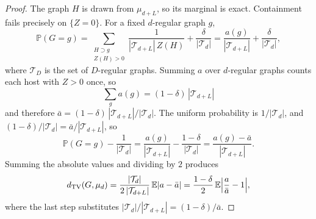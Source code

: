\documentclass[11pt]{article}
\newcommand{\EE}{\mathbb{E}}
\newcommand{\PP}{\mathbb{P}}
\newcommand{\dTV}{d_{\mathrm{TV}}}
\begin{document}
\begin{proof}
The graph \(H\) is drawn from \(\mu_{d+L}\), so its marginal is exact.
Containment fails precisely on \(\{Z=0\}\).
For a fixed \(d\)-regular graph \(g\),
\[
\PP(G=g)
=
\sum_{\substack{H\supset g\\ Z(H)>0}}\frac{1}{|\mathcal T_{d+L}|\,Z(H)}
+
\frac{\delta}{|\mathcal T_d|}
=
\frac{a(g)}{|\mathcal T_{d+L}|}
+
\frac{\delta}{|\mathcal T_d|},
\]
where \(\mathcal T_D\) is the set of \(D\)-regular graphs.
Summing \(a\) over \(d\)-regular graphs counts each host with \(Z>0\) once, so
\[
\sum_g a(g)
=
(1-\delta)\,|\mathcal T_{d+L}|
\]
and therefore \(\bar a=(1-\delta)\,|\mathcal T_{d+L}|/|\mathcal T_d|\).
The uniform probability is \(1/|\mathcal T_d|\), and
\((1-\delta)/|\mathcal T_d|=\bar a/|\mathcal T_{d+L}|\), so
\[
\PP(G=g)-\frac1{|\mathcal T_d|}
=
\frac{a(g)}{|\mathcal T_{d+L}|}
-
\frac{1-\delta}{|\mathcal T_d|}
=
\frac{a(g)-\bar a}{|\mathcal T_{d+L}|}.
\]
Summing the absolute values and dividing by \(2\) produces
\[
\dTV(G,\mu_d)
=
\frac{|\mathcal T_d|}{2\,|\mathcal T_{d+L}|}\,\EE|a-\bar a|
=
\frac{1-\delta}{2}\,
\EE\Bigl|\frac{a}{\bar a}-1\Bigr|,
\]
where the last step substitutes \(|\mathcal T_d|/|\mathcal T_{d+L}|=(1-\delta)/\bar a\).
\end{proof}
\end{document}
